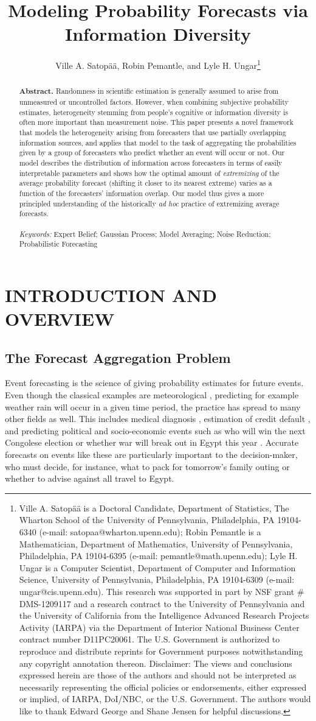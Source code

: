 \documentclass[12pt]{article}
\title{\vspace{-0em} \Large Modeling Probability Forecasts via Information Diversity}
\author{\vspace{-1em}Ville A. Satop\"a\"a, Robin Pemantle, and Lyle H. Ungar\thanks{Ville A. Satop\"a\"a is a Doctoral Candidate, Department of Statistics, The Wharton School of the University of Pennsylvania, Philadelphia, PA 19104-6340 (e-mail: satopaa@wharton.upenn.edu); Robin Pemantle is a Mathematician, Department of Mathematics, University of Pennsylvania, Philadelphia, PA 19104-6395 (e-mail: pemantle@math.upenn.edu); Lyle H. Ungar is a Computer Scientist, Department of Computer and Information Science, University of Pennsylvania, Philadelphia, PA 19104-6309 (e-mail: ungar@cis.upenn.edu). This research was supported in part by NSF grant \# DMS-1209117 and a research contract to the University
of Pennsylvania and the University of California from the Intelligence
Advanced Research Projects Activity (IARPA) via the Department of
Interior National Business Center contract number D11PC20061. The
U.S. Government is authorized to reproduce and distribute reprints for
Government purposes notwithstanding any copyright annotation
thereon. Disclaimer: The views and conclusions expressed herein are
those of the authors and should not be interpreted as necessarily
representing the official policies or endorsements, either expressed
or implied, of IARPA, DoI/NBC, or the U.S. Government.
The authors would like to thank Edward George and Shane Jensen for helpful discussions.}}
\date{\vspace{-8.5ex}}
\theoremstyle{definition}
\theoremstyle{definition}
\begin{document}
\maketitle
\begin{abstract}
\singlespace
\textbf{Abstract.} Randomness in scientific estimation is generally 
assumed to arise from unmeasured or uncontrolled factors. However, 
when combining subjective probability estimates, heterogeneity
stemming from people's cognitive or information diversity is often
more important than measurement noise.  This paper presents a novel
framework that models the heterogeneity arising from forecasters that use 
partially overlapping information sources, and applies that model to 
the task of aggregating the probabilities given by a group of forecasters 
who predict whether an event will occur or not. Our model describes 
the distribution of information across forecasters in terms of easily
interpretable parameters and shows how the optimal amount
of \textit{extremizing} of the average probability forecast (shifting
it closer to its nearest extreme) varies as a function of the forecasters'
information overlap.  Our model thus gives a more principled
understanding of the historically {\it ad hoc} practice of extremizing
average forecasts.\\
\\
\textit{Keywords:} Expert Belief; Gaussian Process; Model
Averaging; Noise Reduction; Probabilistic Forecasting
\end{abstract}




\newpage
\section{INTRODUCTION AND OVERVIEW}

\subsection{The Forecast Aggregation Problem}
Event forecasting is the science of giving probability estimates for future events.  Even though the classical examples are meteorological
\citep{sanders1963subjective}, predicting for example weather rain will occur in a given time period, the practice has 
spread to many other fields as well. This includes medical diagnosis  \citep{pepe2003statistical}, estimation of credit default
\citep{kramer2006evaluating}, and predicting political and
socio-economic events such as who will win
the next Congolese election or whether war will break out in Egypt
this year \citep{tetlock2005expert}. Accurate forecasts on events like these are particularly important to the decision-maker, who must decide, for instance, what to pack
for tomorrow's family outing or whether to advise against all travel
to Egypt.
\end{document}
